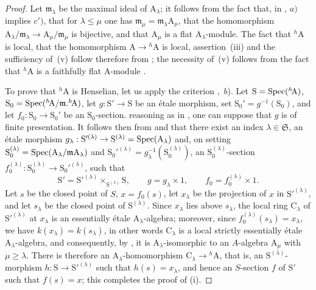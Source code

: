 \begin{proof}
Let $\mathfrak{m}_\lambda$ be the maximal ideal of $\mathrm{A}_\lambda$;
it follows from the fact that, in , $a)$ implies $c')$, that for $\lambda\leq\mu$ one has $\mathfrak{m}_\mu=\mathfrak{m}_\lambda\mathrm{A}_\mu$, that the homomorphism $\mathrm{A}_\lambda/\mathfrak{m}_\lambda\to\mathrm{A}_\mu/\mathfrak{m}_\mu$ is bijective, and that $\mathrm{A}_\mu$ is a flat $\mathrm{A}_\lambda$-module.
The fact that ${}^h\!\mathrm{A}$ is local, that the homomorphism $\mathrm{A}\to{}^h\!\mathrm{A}$ is local, assertion~(iii) and the sufficiency of~(v) follow therefore from ;
the necessity of~(v) follows from the fact that ${}^h\!\mathrm{A}$ is a faithfully flat A-module .

To prove that ${}^h\!\mathrm{A}$ is Henselian, let us apply the criterion ,~$b$).
Let $\mathrm{S}=\operatorname{Spec}({}^h\!\mathrm{A})$, $\mathrm{S}_0=\operatorname{Spec}({}^h\!\mathrm{A}/\mathfrak{m}.{}^h\!\mathrm{A})$, let $g:\mathrm{S}'\to\mathrm{S}$ be an \'{e}tale morphism, set $\mathrm{S}_0'=g^{-1}(\mathrm{S}_0)$, and let $f_0:\mathrm{S}_0\to\mathrm{S}_0'$ be an $\mathrm{S}_0$-section.
reasoning as in , one can suppose that $g$ is of finite presentation.
It follows then from  and  that there exist an index $\lambda\in\mathfrak{S}$, an \'etale morphism $g_\lambda:\mathrm{S}'^{(\lambda)}\to\mathrm{S}^{(\lambda)}=\operatorname{Spec}(\mathrm{A}_\lambda)$ and, on setting $\mathrm{S}_0^{(\lambda)}=\operatorname{Spec}(\mathrm{A}_\lambda/\mathfrak{m}\mathrm{A}_\lambda)$ and $\mathrm{S}_0'^{(\lambda)}=g_\lambda^{-1}(\mathrm{S}_0^{(\lambda)})$, an $\mathrm{S}_0^{(\lambda)}$-section $f_0^{(\lambda)}:\mathrm{S}_0^{(\lambda)}\to\mathrm{S}_0'^{(\lambda)}$, such that
\[
\mathrm{S}'=\mathrm{S}'^{(\lambda)}\times_{\mathrm{S}^{(\lambda)}}\mathrm{S},\qquad
g=g_\lambda\times 1,\qquad
f_0=f_0^{(\lambda)}\times 1.
\]
Let $s$ be the closed point of $S$, $x=f_0(s)$, let $x_\lambda$ be the projection of $x$ in $\mathrm{S}'^{(\lambda)}$, and let $s_\lambda$ be the closed point of $\mathrm{S}^{(\lambda)}$.
Since $x_\lambda$ lies above $s_\lambda$, the local ring $\mathrm{C}_\lambda$ of $\mathrm{S}'^{(\lambda)}$ at $x_\lambda$ is an essentially \'etale $\mathrm{A}_\lambda$-algebra;
moreover, since $f_0^{(\lambda)}(s_\lambda)=x_\lambda$, we have $k(x_\lambda)=k(s_\lambda)$, in other words $\mathrm{C}_\lambda$ is a local strictly essentially \'etale $\mathrm{A}_\lambda$-algebra, and consequently, by , it is $\mathrm{A}_\lambda$-isomorphic to an $A$-algebra $\mathrm{A}_\mu$ with $\mu\geq\lambda$.
There is therefore an $\mathrm{A}_\lambda$-homomorphism $\mathrm{C}_\lambda\to{}^h\!\mathrm{A}$, that is, an $\mathrm{S}^{(\lambda)}$-morphism $h:\mathrm{S}\to\mathrm{S}'^{(\lambda)}$ such that $h(s)=x_\lambda$, and hence an $S$-section $f$ of $\mathrm{S}'$ such that $f(s)=x$;
this completes the proof of (i).


\end{proof}
